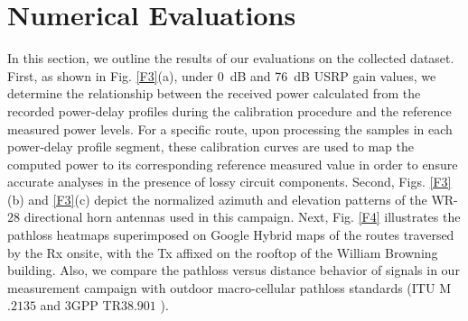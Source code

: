 \documentclass[10pt, twocolumn]{IEEEtran}
\begin{document}
\section{Numerical Evaluations}\label{S4}
\vspace{-2mm}
In this section, we outline the results of our evaluations on the collected dataset. First, as shown in Fig. \ref{F3}(a), under \SI{0}{\deci\bel} and \SI{76}{\deci\bel} USRP gain values, we determine the relationship between the received power calculated from the recorded power-delay profiles during the calibration procedure and the reference measured power levels. For a specific route, upon processing the samples in each power-delay profile segment, these calibration curves are used to map the computed power to its corresponding reference measured value in order to ensure accurate analyses in the presence of lossy circuit components. Second, Figs. \ref{F3}(b) and \ref{F3}(c) depict the normalized azimuth and elevation patterns of the WR-$28$ directional horn antennas used in this campaign. Next, Fig. \ref{F4} illustrates the pathloss heatmaps superimposed on Google Hybrid maps of the routes traversed by the Rx onsite, with the Tx affixed on the rooftop of the William Browning building. Also, we compare the pathloss versus distance behavior of signals in our measurement campaign with outdoor macro-cellular pathloss standards (ITU M$.2135$ and $3$GPP TR$38.901$ \cite{MacCartneyModelsOverview, Qualcomm3GPP}). 
\end{document}
